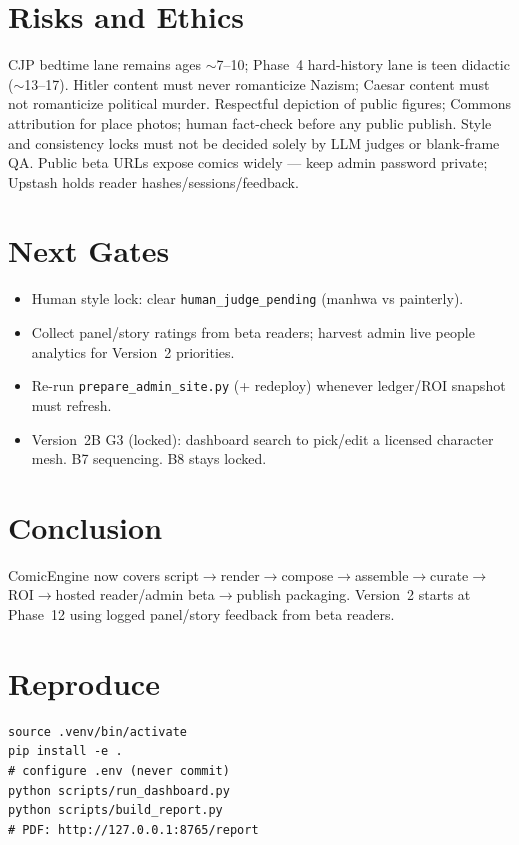 \documentclass[10pt,twocolumn,letterpaper]{article}
\begin{document}
\section{Risks and Ethics}
CJP bedtime lane remains ages $\sim$7--10; Phase~4 hard-history lane is teen didactic ($\sim$13--17).
Hitler content must never romanticize Nazism; Caesar content must not romanticize political murder.
Respectful depiction of public figures; Commons attribution for place photos; human fact-check before any public publish.
Style and consistency locks must not be decided solely by LLM judges or blank-frame QA.
Public beta URLs expose comics widely --- keep admin password private; Upstash holds reader hashes/sessions/feedback.

\section{Next Gates}
\begin{itemize}[leftmargin=*,itemsep=1pt]
  \item Human style lock: clear \texttt{human\_judge\_pending} (manhwa vs painterly).
  \item Collect panel/story ratings from beta readers; harvest admin live people analytics for Version~2 priorities.
  \item Re-run \texttt{prepare\_admin\_site.py} (+ redeploy) whenever ledger/ROI snapshot must refresh.
  \item Version~2B G3 (locked): dashboard search to pick/edit a licensed character mesh. B7 sequencing. B8 stays locked.
\end{itemize}

\section{Conclusion}
ComicEngine now covers script$\rightarrow$render$\rightarrow$compose$\rightarrow$assemble$\rightarrow$curate$\rightarrow$ROI$\rightarrow$hosted reader/admin beta$\rightarrow$publish packaging.
Version~2 starts at Phase~12 using logged panel/story feedback from beta readers.
\appendix
\section{Reproduce}
\begin{verbatim}
source .venv/bin/activate
pip install -e .
# configure .env (never commit)
python scripts/run_dashboard.py
python scripts/build_report.py
# PDF: http://127.0.0.1:8765/report
\end{verbatim}
\end{document}
